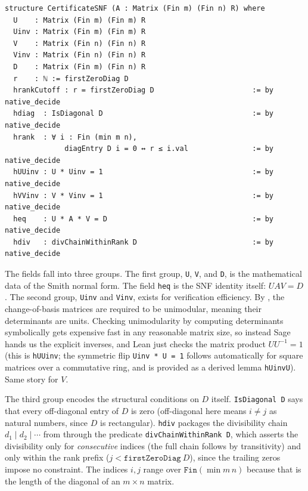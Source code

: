 \documentclass[11pt]{article}
\theoremstyle{plain}
\theoremstyle{definition}
\theoremstyle{remark}
\newcommand{\lean}[1]{\lstinline[language=lean]|#1|}
\begin{document}
\begin{lstlisting}[caption={The core SNF certificate.},label={lst:snf-certificate}]
structure CertificateSNF (A : Matrix (Fin m) (Fin n) R) where
  U    : Matrix (Fin m) (Fin m) R
  Uinv : Matrix (Fin m) (Fin m) R
  V    : Matrix (Fin n) (Fin n) R
  Vinv : Matrix (Fin n) (Fin n) R
  D    : Matrix (Fin m) (Fin n) R
  r    : ℕ := firstZeroDiag D
  hrankCutoff : r = firstZeroDiag D                       := by native_decide
  hdiag  : IsDiagonal D                                   := by native_decide
  hrank  : ∀ i : Fin (min m n),
              diagEntry D i = 0 ↔ r ≤ i.val               := by native_decide
  hUUinv : U * Uinv = 1                                   := by native_decide
  hVVinv : V * Vinv = 1                                   := by native_decide
  heq    : U * A * V = D                                  := by native_decide
  hdiv   : divChainWithinRank D                           := by native_decide
\end{lstlisting}

The fields fall into three groups. The first group, \lean{U}, \lean{V}, and
\lean{D}, is the mathematical data of the Smith normal form. The field
\lean{heq} is the SNF identity itself: \(UAV = D\). The second group,
\lean{Uinv} and \lean{Vinv}, exists for verification efficiency. By
, the change-of-basis matrices are required to be unimodular,
meaning their determinants are units. Checking unimodularity by computing
determinants symbolically gets expensive fast in any reasonable matrix size,
so instead Sage hands us the explicit inverses, and Lean just checks the
matrix product \(U U^{-1} = 1\) (this is \lean{hUUinv}; the symmetric flip
\lean{Uinv * U = 1} follows automatically for square matrices over a
commutative ring, and is provided as a derived lemma \lean{hUinvU}). Same story
for \(V\).

The third group encodes the structural conditions on \(D\) itself.
\lean{IsDiagonal D} says that every off-diagonal entry of \(D\) is zero
(off-diagonal here means \(i \neq j\) as natural numbers, since \(D\) is
rectangular). \lean{hdiv} packages the divisibility chain
\(d_1 \mid d_2 \mid \cdots\) from  through the predicate
\lean{divChainWithinRank D}, which asserts the divisibility only for
\emph{consecutive} indices (the full chain follows by transitivity) and
only within the rank prefix (\(j < \mathtt{firstZeroDiag}\ D\)), since the
trailing zeros impose no constraint. The indices \(i, j\) range over
\(\mathtt{Fin}(\min m\, n)\) because that is the length of the diagonal
of an \(m \times n\) matrix.
\end{document}
